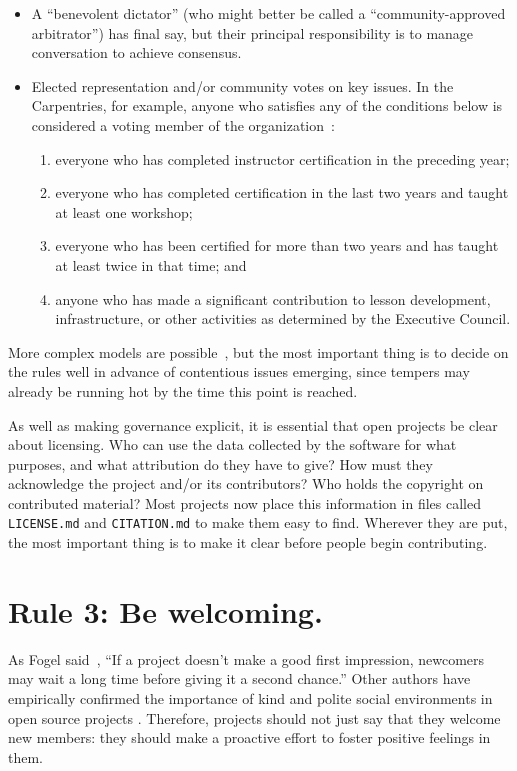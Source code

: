 \documentclass[10pt,letterpaper]{article}
\newcommand{\rulemajor}[1]{\section*{#1}}
\begin{document}
\begin{itemize}
	
\item
  A ``benevolent dictator'' (who might better be called a ``community-approved arbitrator'') has final say,
  but their principal responsibility is to manage conversation to achieve consensus.
	
\item
  Elected representation and/or community votes on key issues.
  In the Carpentries,
  for example,
  anyone who satisfies any of the conditions below is considered a voting member of the organization~\cite{carpentries-bylaws}:
  \begin{enumerate}
  \item
    everyone who has completed instructor certification in the preceding year;
  \item
    everyone who has completed certification in the last two years and taught at least one workshop;
  \item
    everyone who has been certified for more than two years and has taught at least twice in that time; and
  \item
    anyone who has made a significant contribution to lesson development, infrastructure, or other activities
    as determined by the Executive Council.
  \end{enumerate}

\end{itemize}

More complex models are possible~\cite{apache-governance},
but the most important thing is to decide on the rules well in advance of contentious issues emerging,
since tempers may already be running hot by the time this point is reached.

As well as making governance explicit,
it is essential that open projects be clear about licensing.
Who can use the data collected by the software for what purposes,
and what attribution do they have to give?
How must they acknowledge the project and/or its contributors?
Who holds the copyright on contributed material?
Most projects now place this information in files called \texttt{LICENSE.md} and \texttt{CITATION.md}
to make them easy to find.
Wherever they are put,
the most important thing is to make it clear before people begin contributing.

\rulemajor{Rule 3: Be welcoming.}

As Fogel said~\cite{fogel2005},
``If a project doesn't make a good first impression, newcomers may wait a long time before giving it a second chance.''
Other authors have empirically confirmed the importance of kind and polite social environments
in open source projects \cite{singh2012,steinmacher2013,steinmacher2018a}.
Therefore,
projects should not just say that they welcome new members:
they should make a proactive effort to foster positive feelings in them.
\end{document}
